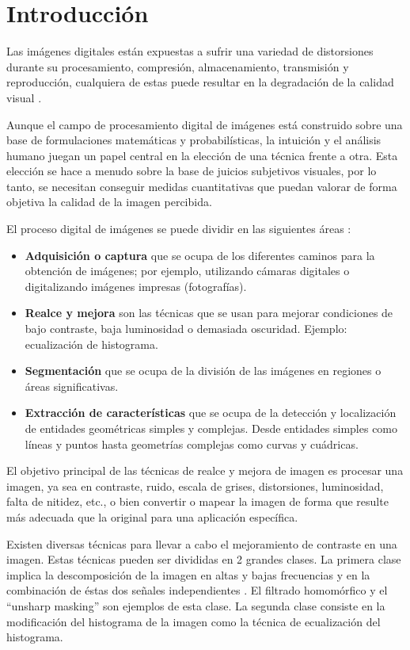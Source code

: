 \chapter{Introducción}

Las imágenes digitales están expuestas a sufrir una variedad de distorsiones durante su procesamiento, compresión, almacenamiento, transmisión y reproducción, cualquiera de estas puede resultar en la degradación de la calidad visual \cite{digitalimganalysis}.

Aunque el campo de procesamiento digital de imágenes está construido sobre una base de formulaciones matemáticas y probabilísticas, la intuición y el análisis humano juegan un papel central en la elección de una técnica frente a otra. Esta elección se hace a menudo sobre la base de juicios subjetivos visuales, por lo tanto, se necesitan conseguir medidas cuantitativas que puedan valorar de forma objetiva la calidad de la imagen percibida.

El proceso digital de imágenes se puede dividir en las siguientes áreas \cite{digitalimageprocessing}:
\begin{itemize}
\item \textbf{Adquisición o captura} que se ocupa de los diferentes caminos para la obtención de imágenes; por ejemplo, utilizando cámaras digitales o digitalizando imágenes impresas (fotografías).
\item \textbf{Realce y mejora} son las técnicas que se usan para mejorar condiciones de bajo contraste, baja luminosidad o demasiada oscuridad. Ejemplo: ecualización de histograma.
\item \textbf{Segmentación} que se ocupa de la división de las imágenes en regiones o áreas significativas.
\item \textbf{Extracción de características} que se ocupa de la detección y localización de entidades geométricas simples y complejas. Desde entidades simples como líneas y puntos hasta geometrías complejas como curvas y cuádricas.
\end{itemize}

El objetivo principal de las técnicas de realce y mejora de imagen es procesar una imagen, ya sea en contraste, ruido, escala de grises, distorsiones, luminosidad, falta de nitidez, etc., o bien convertir o mapear la imagen de forma que resulte más adecuada que la original para una aplicación específica.

Existen diversas técnicas para llevar a cabo el mejoramiento de contraste en una imagen. Estas técnicas pueden ser divididas en 2 grandes clases. La primera clase implica la descomposición de la imagen en altas y bajas frecuencias y en la combinación de éstas dos señales independientes \cite{kober2002unsharp}. El filtrado homomórfico y el “unsharp masking” son ejemplos de esta clase. La segunda clase consiste en la modificación del histograma de la imagen como la técnica de ecualización del histograma.

